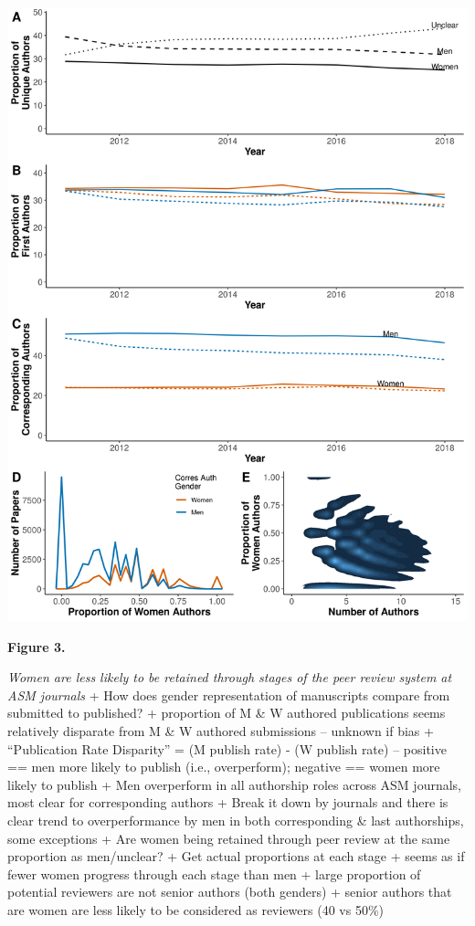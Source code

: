 \documentclass[11pt,]{article}
\begin{document}
\includegraphics{Figure_3.png}

\textbf{Figure 3.}

\emph{Women are less likely to be retained through stages of the peer
review system at ASM journals} + How does gender representation of
manuscripts compare from submitted to published? + proportion of M \& W
authored publications seems relatively disparate from M \& W authored
submissions -- unknown if bias + ``Publication Rate Disparity'' = (M
publish rate) - (W publish rate) -- positive == men more likely to
publish (i.e., overperform); negative == women more likely to publish +
Men overperform in all authorship roles across ASM journals, most clear
for corresponding authors + Break it down by journals and there is clear
trend to overperformance by men in both corresponding \& last
authorships, some exceptions + Are women being retained through peer
review at the same proportion as men/unclear? + Get actual proportions
at each stage + seems as if fewer women progress through each stage than
men + large proportion of potential reviewers are not senior authors
(both genders) + senior authors that are women are less likely to be
considered as reviewers (40 vs 50\%)
\end{document}
